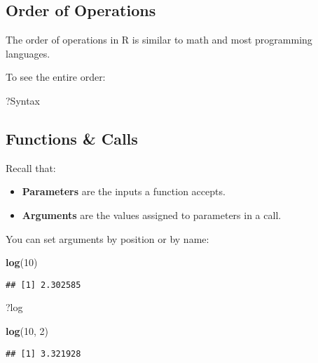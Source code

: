 \documentclass[
]{article}
\newenvironment{Shaded}{\begin{snugshade}}{\end{snugshade}}
\newcommand{\DecValTok}[1]{\textcolor[rgb]{0.00,0.00,0.81}{#1}}
\newcommand{\KeywordTok}[1]{\textcolor[rgb]{0.13,0.29,0.53}{\textbf{#1}}}
\newcommand{\NormalTok}[1]{#1}
\providecommand{\tightlist}{%
  \setlength{\itemsep}{0pt}\setlength{\parskip}{0pt}}
\begin{document}
\hypertarget{order-of-operations}{%
\subsection{Order of Operations}\label{order-of-operations}}

The order of operations in R is similar to math and most programming
languages.

To see the entire order:

\begin{Shaded}
\begin{Highlighting}[]
\NormalTok{?Syntax}
\end{Highlighting}
\end{Shaded}

\hypertarget{functions-calls}{%
\subsection{Functions \& Calls}\label{functions-calls}}

Recall that:

\begin{itemize}
\tightlist
\item
  \textbf{Parameters} are the inputs a function accepts.
\item
  \textbf{Arguments} are the values assigned to parameters in a call.
\end{itemize}

You can set arguments by position or by name:

\begin{Shaded}
\begin{Highlighting}[]
\KeywordTok{log}\NormalTok{(}\DecValTok{10}\NormalTok{)}
\end{Highlighting}
\end{Shaded}

\begin{verbatim}
## [1] 2.302585
\end{verbatim}

\begin{Shaded}
\begin{Highlighting}[]
\NormalTok{?log}

\KeywordTok{log}\NormalTok{(}\DecValTok{10}\NormalTok{, }\DecValTok{2}\NormalTok{)}
\end{Highlighting}
\end{Shaded}

\begin{verbatim}
## [1] 3.321928
\end{verbatim}
\end{document}
